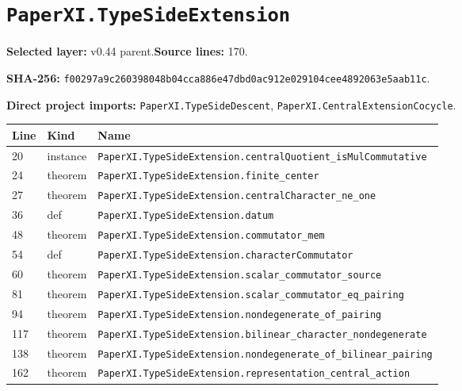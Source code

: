 \documentclass[10pt,oneside]{book}
\begin{document}
\section{\texorpdfstring{\nolinkurl{PaperXI.TypeSideExtension}}{PaperXI.TypeSideExtension}}\label{module:PaperXI.TypeSideExtension}

\textbf{Selected layer:} v0.44 parent.\quad\textbf{Source lines:} 170.\par\textbf{SHA-256:} {\scriptsize\nolinkurl{f00297a9c260398048b04cca886e47dbd0ac912e029104cee4892063e5aab11c}}.


\textbf{Direct project imports:} \nolinkurl{PaperXI.TypeSideDescent}, \nolinkurl{PaperXI.CentralExtensionCocycle}.

\begin{longtable}{@{}p{}p{}p{}@{}}\toprule Line&Kind&Name\\\midrule\endhead

20&instance&\nolinkurl{PaperXI.TypeSideExtension.centralQuotient_isMulCommutative}\\

24&theorem&\nolinkurl{PaperXI.TypeSideExtension.finite_center}\\

27&theorem&\nolinkurl{PaperXI.TypeSideExtension.centralCharacter_ne_one}\\

36&def&\nolinkurl{PaperXI.TypeSideExtension.datum}\\

48&theorem&\nolinkurl{PaperXI.TypeSideExtension.commutator_mem}\\

54&def&\nolinkurl{PaperXI.TypeSideExtension.characterCommutator}\\

60&theorem&\nolinkurl{PaperXI.TypeSideExtension.scalar_commutator_source}\\

81&theorem&\nolinkurl{PaperXI.TypeSideExtension.scalar_commutator_eq_pairing}\\

94&theorem&\nolinkurl{PaperXI.TypeSideExtension.nondegenerate_of_pairing}\\

117&theorem&\nolinkurl{PaperXI.TypeSideExtension.bilinear_character_nondegenerate}\\

138&theorem&\nolinkurl{PaperXI.TypeSideExtension.nondegenerate_of_bilinear_pairing}\\

162&theorem&\nolinkurl{PaperXI.TypeSideExtension.representation_central_action}\\

\bottomrule\end{longtable}
\end{document}
